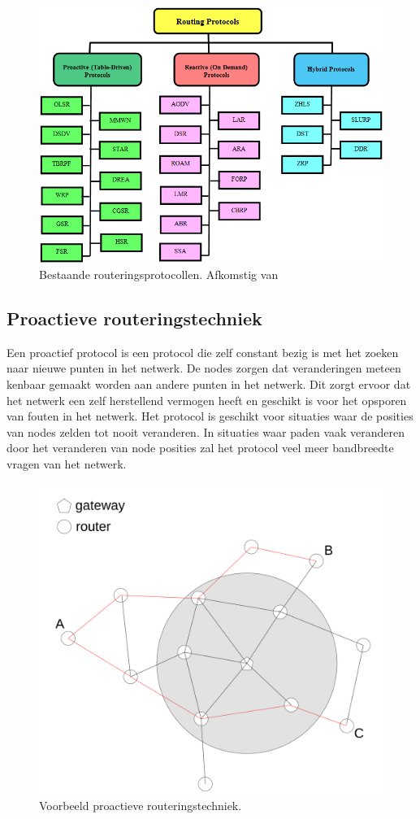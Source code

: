 \documentclass[a4paper, 11pt, oneside]{report}
\begin{document}
\begin{figure}[H]
	\begin{center}\includegraphics[width=0.6\linewidth]{Afbeeldingen/meshprotocollen.png}\end{center}
	\caption{Bestaande routeringsprotocollen. Afkomstig van \protect\cite{meshprotocols}}
	\label{fig:meshprotcollen}
\end{figure}

\subsection{Proactieve routeringstechniek}
\label{sec:meshnetwerktechniek:proactief}

Een proactief protocol is een protocol die zelf constant bezig is met het zoeken naar nieuwe punten in het netwerk.
De nodes zorgen dat veranderingen meteen kenbaar gemaakt worden aan andere punten in het netwerk. 
Dit zorgt ervoor dat het netwerk een zelf herstellend vermogen heeft en geschikt is voor het opsporen van fouten in het netwerk.
Het protocol is geschikt voor situaties waar de posities van nodes zelden tot nooit veranderen. 
In situaties waar paden vaak veranderen door het veranderen van node posities zal het protocol veel meer bandbreedte vragen van het netwerk. 

\begin{figure}[H]
	\begin{center}\includegraphics[width=0.45\linewidth]{Afbeeldingen/proactive.png}\end{center}
	\caption{Voorbeeld proactieve routeringstechniek.}
	\label{fig:proactief}
\end{figure}
\end{document}
